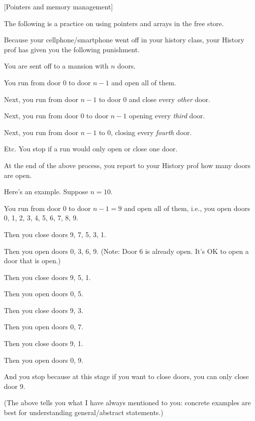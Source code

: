   [Pointers and memory management]
  
The following is a practice on using pointers and
arrays in the free store.

Because your cellphone/smartphone went off in your history class,
your History prof has given you the following punishment.

You are sent off to a 
mansion with $n$ doors.
\begin{enumerate}[nosep]

  \li You run from door 0 to door $n-1$ and open all of them.

  \li Next, you run from door $n - 1$ to door 0 and close every \textit{other}
  door.

  \li Next, you run from door $0$ to door $n-1$ opening every \textit{third}
  door.

  \li Next, you run from door $n-1$ to $0$, closing every \textit{fourth} door.

  \li Etc. You stop if a run would only open or close one door.

\end{enumerate}
At the end of the above process, you report to your History prof how many
doors are open.

Here's an example. Suppose $n = 10$.
\begin{enumerate}[nosep]
  \li You run from door 0 to door $n - 1 = 9$ and open all of them, i.e.,
  you open doors 0, 1, 2, 3, 4, 5, 6, 7, 8, 9.
  
  \li Then you close doors 9, 7, 5, 3, 1.
  
  \li Then you open doors 0, 3, 6, 9.
  (Note: Door 6 is already open. It's OK to open a door that is open.) 
  
  \li Then you close doors 9, 5, 1.
  
  \li Then you open doors 0, 5.
  
  \li Then you close doors 9, 3.
  
  \li Then you open doors 0, 7.
  
  \li Then you close doors 9, 1.
  
  \li Then you open doors 0, 9.
  
  \li And you stop because at this stage if you want to close doors, you can
  only close door 9.

\end{enumerate}
(The above tells you what I have always mentioned to you:
concrete examples are best for understanding general/abstract statements.)  

